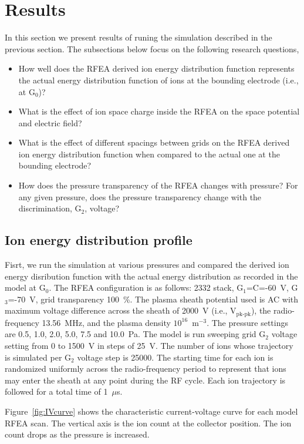 \section{Results}
In this section we present results of runing the simulation described in the previous section. The subsections below focus on the following research questions, 

\begin{itemize}
  \item How well does the RFEA derived ion energy distribution function represents the actual energy distribution function of ions at the bounding electrode (i.e., at G$_0$)? 
  \item What is the effect of ion space charge inside the RFEA on the space potential and electric field?  
  \item What is the effect of different spacings between grids on the RFEA derived ion energy distribution function when compared to the actual one at the bounding electrode?
  \item How does the pressure transparency of the RFEA changes with pressure? For any given pressure, does the pressure transparency change with the discrimination, G$_2$, voltage? 
\end{itemize}


\subsection{Ion energy distribution profile}
Fisrt, we run the simulation at various pressures and compared the derived ion energy disribution function with the actual energy distribution as recorded in the model at G$_0$. The RFEA configuration is as follows: 2332 stack, G$_1$=C=-60~V, G$_3$=-70~V, grid transparency 100~\%. The plasma sheath potential used is AC with maximum voltage difference across the sheath of 2000~V (i.e., V$_\text{pk-pk}$), the radio-frequency 13.56~MHz, and the plasma density $10^{16}$~m$^{-3}$. The pressure settings are 0.5, 1.0, 2.0, 5.0, 7.5 and 10.0~Pa. The model is run sweeping grid G$_2$ voltage setting from 0 to 1500~V in steps of 25~V. The number of ions whose trajectory is simulated per G$_2$ voltage step is 25000. The starting time for each ion is randomized uniformly across the radio-frequency period to represent that ions may enter the sheath at any point during the RF cycle. Each ion trajectory is followed for a total time of 1~$\mu$s. 

Figure~\ref{fig:IVcurve} shows the characteristic current-voltage curve for each model RFEA scan. The vertical axis is the ion count at the collector position. The ion count drops as the pressure is increased. 

